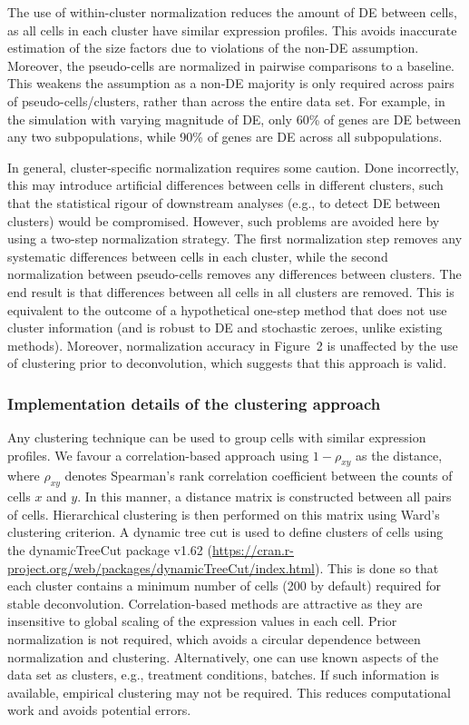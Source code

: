 \documentclass{article}
\newcommand{\figdeconv}{2}
\begin{document}
The use of within-cluster normalization reduces the amount of DE between cells, as all cells in each cluster have similar expression profiles.
This avoids inaccurate estimation of the size factors due to violations of the non-DE assumption.
Moreover, the pseudo-cells are normalized in pairwise comparisons to a baseline.
This weakens the assumption as a non-DE majority is only required across pairs of pseudo-cells/clusters, rather than across the entire data set.
For example, in the simulation with varying magnitude of DE, only 60\% of genes are DE between any two subpopulations, while 90\% of genes are DE across all subpopulations.

In general, cluster-specific normalization requires some caution.
Done incorrectly, this may introduce artificial differences between cells in different clusters, 
    such that the statistical rigour of downstream analyses (e.g., to detect DE between clusters) would be compromised.
However, such problems are avoided here by using a two-step normalization strategy.
The first normalization step removes any systematic differences between cells in each cluster, 
    while the second normalization between pseudo-cells removes any differences between clusters.
The end result is that differences between all cells in all clusters are removed.
This is equivalent to the outcome of a hypothetical one-step method that does not use cluster information (and is robust to DE and stochastic zeroes, unlike existing methods).
Moreover, normalization accuracy in Figure~\figdeconv{} is unaffected by the use of clustering prior to deconvolution, which suggests that this approach is valid.

\subsubsection{Implementation details of the clustering approach}
Any clustering technique can be used to group cells with similar expression profiles.
We favour a correlation-based approach using $1-\rho_{xy}$ as the distance, where $\rho_{xy}$ denotes Spearman's rank correlation coefficient between the counts of cells $x$ and $y$.
In this manner, a distance matrix is constructed between all pairs of cells.
Hierarchical clustering is then performed on this matrix using Ward's clustering criterion.
A dynamic tree cut is used to define clusters of cells using the dynamicTreeCut package v1.62 (\url{https://cran.r-project.org/web/packages/dynamicTreeCut/index.html}).
This is done so that each cluster contains a minimum number of cells (200 by default) required for stable deconvolution.
Correlation-based methods are attractive as they are insensitive to global scaling of the expression values in each cell.
Prior normalization is not required, which avoids a circular dependence between normalization and clustering.
Alternatively, one can use known aspects of the data set as clusters, e.g., treatment conditions, batches.
If such information is available, empirical clustering may not be required.
This reduces computational work and avoids potential errors.
\end{document}
